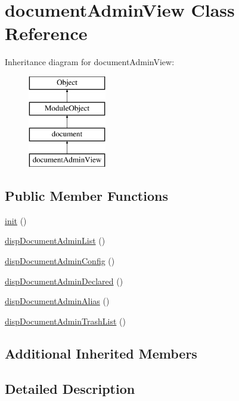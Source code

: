 \hypertarget{classdocumentAdminView}{\section{document\+Admin\+View Class Reference}
\label{classdocumentAdminView}
}
Inheritance diagram for document\+Admin\+View\+:\begin{figure}[H]
\begin{center}
\leavevmode
\includegraphics[height=4.000000cm]{classdocumentAdminView}
\end{center}
\end{figure}
\subsection*{Public Member Functions}
\begin{DoxyCompactItemize}
\item 
\hyperlink{classdocumentAdminView_aed09978af62e856f18f80e8573968c3c}{init} ()
\item 
\hyperlink{classdocumentAdminView_a522a3fbd85960249d098fd1b8e5a0117}{disp\+Document\+Admin\+List} ()
\item 
\hyperlink{classdocumentAdminView_a4b41049c99341fbb4a782da55d3737e5}{disp\+Document\+Admin\+Config} ()
\item 
\hyperlink{classdocumentAdminView_ad94b3d2db90d0912e4f24a1efb9bff46}{disp\+Document\+Admin\+Declared} ()
\item 
\hyperlink{classdocumentAdminView_a7f9210670150395b7ef8c6209ce0ac53}{disp\+Document\+Admin\+Alias} ()
\item 
\hyperlink{classdocumentAdminView_a677a59c8ecf38161449f397e85f22fa4}{disp\+Document\+Admin\+Trash\+List} ()
\end{DoxyCompactItemize}
\subsection*{Additional Inherited Members}


\subsection{Detailed Description}


